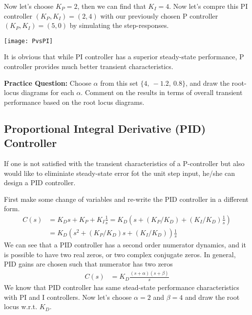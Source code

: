 \documentclass[twoside]{article}
\begin{document}
Now let's choose $K_P = 2$, then we can find that $K_I = 4$.
Now let's compre this PI controller $(K_P , K_I) = (2,4)$ with our
previously chosen P controller $(K_P , K_I) = (5,0)$ by simulating
the step-responses. 

\vspace{12 pt}

  \begin{minipage}[h]{1\linewidth}
    \begin{center}
      \texttt{[image: PvsPI]}
    \end{center}
  \end{minipage}

\vspace{12 pt}

It is obvious that while PI controller has a superior steady-state
performance, P controller provides much better transient
characteristics. 

\textbf{Practice Question:} Choose $\alpha$ from this set  $\lbrace 4,
\ -1.2, \  0.8  \rbrace$, and draw the root-locus diagrams for each
$\alpha$. Comment on the results in terms of overall transient performance
based on the root locus diagrams.

\subsection{Proportional Integral Derivative (PID) Controller}

If one is not satisfied with the transient characteristics of a
P-controller but also would like to eliminiate steady-state error
fot the unit step input, he/she can design a PID controller. 

First make some change of variables and re-write the PID controller in a different form.
%
\begin{align*}
 C(s) &= K_D s + K_P + K_I \frac{1}{s} = K_D  \left( s +   (K_P/K_D) +
  (K_I/K_D) \frac{1}{s} \right)\\
&= K_D  \left( s^2 +   (K_P/K_D) s  + (K_I/K_D) \right) \frac{1}{s}
\end{align*}
%
We can see that a PID controller has a second order numerator
dynamics, and it is possible to have two real zeros, or two complex
conjugate zeros. In general, PID gains are chosen such that 
numerator has two zeros
\begin{align*}
 C(s) &= K_D \frac{(s+\alpha) (s + \beta)}{s}
\end{align*}
%
We know that PID controller has same stead-state performance
characteristics with PI and I controllers. Now let's choose $\alpha =
2$ and $\beta = 4$ and draw the root locus w.r.t. $K_D$.
\end{document}
